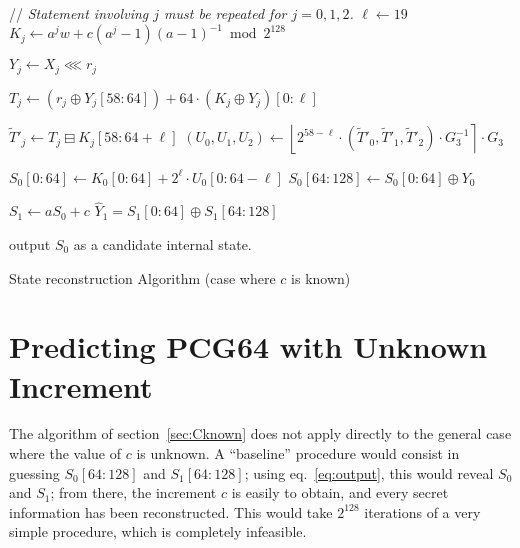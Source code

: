 \documentclass[submission,svgnames,journal=tosc]{iacrtrans}
\begin{document}
\begin{algorithm}
\begin{algorithmic}[1]
  \State // \emph{Statement involving $j$ must be repeated for $j=0, 1, 2$.}
  \State $\ell \gets 19$
   
    \State $K_j \gets a^j w + c (a^j - 1)(a-1)^{-1} \bmod 2^{128}$    
    
     
    
    \State $Y_j \gets X_j \lll r_j$ 
    
    \State $T_j \gets \left(r_j \oplus Y_j[58:64]\right) +  64 \cdot \left(K_j \oplus Y_j\right)[0:\ell]$  
    
    \State $\widetilde T'_j \gets T_j \boxminus K_j[58:64+\ell]$  
    \State $(U_0, U_1, U_2) \gets \left\lfloor 2^{58-\ell} \cdot (\widetilde T'_0, \widetilde T'_1, \widetilde T'_2) \cdot  G_3^{-1} \right\rceil \cdot G_3$ 

    \State $S_0[0:64] \gets  K_0[0:64] + 2^{\ell} \cdot U_0[0:64-\ell]$ 
    \State $S_0[64:128] \gets S_0[0:64] \oplus Y_0$ 
    
    \State $S_1 \gets a  S_0 + c$ 
    \State $\widehat{Y}_1 =  S_1[0:64] \oplus  S_1[64:128]$
    
     
    \State output $S_0$ as a candidate internal state.
    \EndIf
    \EndFor
    \EndFor
    \EndProcedure
  \end{algorithmic}
  \caption{State reconstruction Algorithm (case where $c$ is known)}
  \label{algo:known}
\end{algorithm}
  
\section{Predicting PCG64 with Unknown Increment}
\label{sec:Cunknown}

The algorithm of section~\ref{sec:Cknown} does not apply directly to the general
case where the value of $c$ is unknown. A ``baseline'' procedure would consist
in guessing $S_0[64:128]$ and $S_1[64:128]$; using eq.~\eqref{eq:output}, this
would reveal $S_0$ and $S_1$; from there, the increment $c$ is easily to obtain,
and every secret information has been reconstructed. This would take $2^{128}$
iterations of a very simple procedure, which is completely infeasible.
\end{document}
